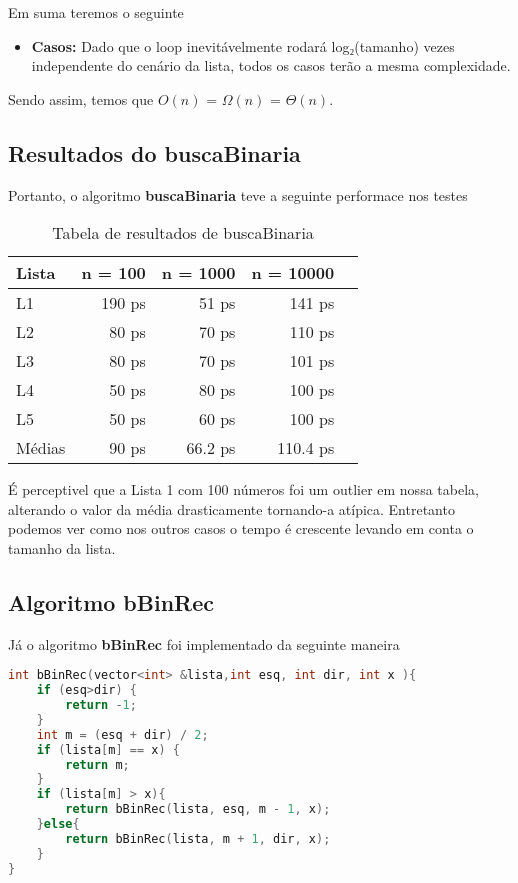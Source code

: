 Em suma teremos o seguinte

\begin{itemize}
	\item \textbf{Casos:} Dado que o loop inevitávelmente rodará log₂(tamanho) vezes independente do cenário da lista, todos os casos terão a mesma complexidade.
 
\end{itemize}

Sendo assim, temos que $O(n)$ = $\Omega(n)$ = $\Theta(n)$.

\subsection{Resultados do buscaBinaria}

Portanto, o algoritmo \textbf{buscaBinaria} teve a seguinte performace nos testes

\begin{table}[h!]
	\centering
	\caption{Tabela de resultados de buscaBinaria}
	\label{tab:busc_bin_result}
	\begin{tabular}{lrrrr}
		\toprule
		Lista   & n = 100   & n = 1000  & n = 10000 \\
		\midrule
		L1      & 190 ps    & 51 ps    & 141 ps  \\
		L2      & 80 ps    & 70 ps    & 110 ps  \\
		L3      & 80 ps    & 70 ps    & 101 ps  \\
		L4      & 50 ps    & 80 ps    & 100 ps  \\
		L5      & 50 ps    & 60 ps    & 100 ps  \\
		\midrule
		Médias  & 90 ps  & 66.2 ps  & 110.4 ps \\
		\bottomrule
	\end{tabular}
\end{table}

É perceptivel que a Lista 1 com 100 números foi um outlier em nossa tabela, alterando o valor da média drasticamente tornando-a atípica. Entretanto podemos ver como nos outros casos o tempo é crescente levando em conta o tamanho da lista.

\subsection{Algoritmo bBinRec}

Já o algoritmo \textbf{bBinRec} foi implementado da seguinte maneira 

\begin{lstlisting}[language=C++]
int bBinRec(vector<int> &lista,int esq, int dir, int x ){
    if (esq>dir) {
        return -1;
    }
    int m = (esq + dir) / 2;
    if (lista[m] == x) {
        return m;
    }
    if (lista[m] > x){
        return bBinRec(lista, esq, m - 1, x);
    }else{
        return bBinRec(lista, m + 1, dir, x);
    }
}
\end{lstlisting}

